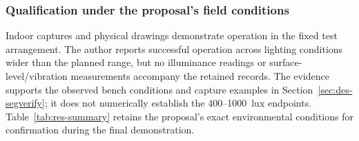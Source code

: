 \subsubsection{Qualification under the proposal's field conditions}
\label{sec:res-conditions}
Indoor captures and physical drawings demonstrate operation in the fixed test arrangement. The author reports successful operation across lighting conditions wider than the planned range, but no illuminance readings or surface-level/vibration measurements accompany the retained records. The evidence supports the observed bench conditions and capture examples in Section~\ref{sec:des-segverify}; it does not numerically establish the 400--1000~lux endpoints. Table~\ref{tab:res-summary} retains the proposal's exact environmental conditions for confirmation during the final demonstration.
\FloatBarrier
